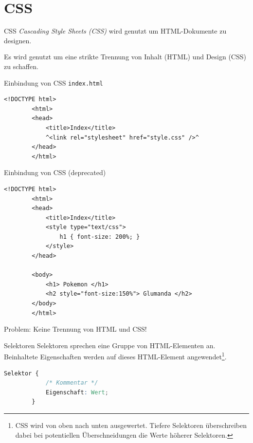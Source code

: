 \section{CSS}

\begin{defi}{CSS}
    \emph{Cascading Style Sheets (CSS)} wird genutzt um HTML-Dokumente zu designen.

    Es wird genutzt um eine strikte Trennung von Inhalt (HTML) und Design (CSS) zu schaffen.
\end{defi}

\begin{example}{Einbindung von CSS}
    \texttt{index.html}
    \begin{lstlisting}[language=HTML5]
        <!DOCTYPE html>
        <html>
        <head>
            <title>Index</title>
            ^<link rel="stylesheet" href="style.css" />^
        </head>
        </html>
    \end{lstlisting}
\end{example}

\begin{example}{Einbindung von CSS (deprecated)}
    \begin{lstlisting}[language=HTML5]
        <!DOCTYPE html>
        <html>
        <head>
            <title>Index</title>
            <style type="text/css">
                h1 { font-size: 200%; }
            </style>
        </head>

        <body>
            <h1> Pokemon </h1>
            <h2 style="font-size:150%"> Glumanda </h2>
        </body>
        </html>
    \end{lstlisting}

    Problem: Keine Trennung von HTML und CSS!
\end{example}

\begin{defi}{Selektoren}
    Selektoren sprechen eine Gruppe von HTML-Elementen an.
    Beinhaltete Eigenschaften werden auf dieses HTML-Element angewendet\footnote{
        CSS wird von oben nach unten ausgewertet.
        Tiefere Selektoren überschreiben dabei bei potentiellen Überschneidungen die Werte höherer Selektoren.
    }.

    \begin{lstlisting}[language=CSS]
        Selektor {
            /* Kommentar */
            Eigenschaft: Wert;
        }
    \end{lstlisting}
\end{defi}

